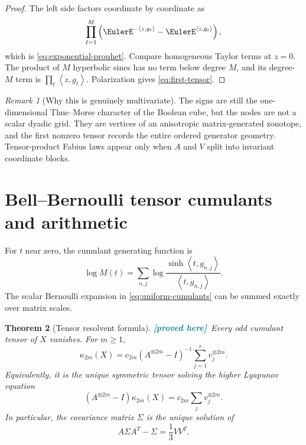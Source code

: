 \documentclass[11pt,oneside]{article}
\newtheorem{theorem}{Theorem}[section]
\theoremstyle{definition}
\theoremstyle{remark}
\newtheorem{remark}[theorem]{Remark}
\newcommand{\ip}[2]{\left\langle #1,#2\right\rangle}
\newcommand{\New}{\textcolor{teal}{\textbf{[proved here]}}}
\begin{document}
\begin{proof}
The left side factors coordinate by coordinate as
\[
 \prod_{\ell=1}^M
 \left(\EulerE^{-\ip{z}{g_\ell}}-\EulerE^{\ip{z}{g_\ell}}\right),
\]
which is \eqref{eq:exponential-prouhet}.  Compare homogeneous Taylor terms at
$z=0$.  The product of $M$ hyperbolic sines has no term below degree $M$, and
its degree-$M$ term is $\prod_\ell\ip{z}{g_\ell}$.  Polarization gives
\eqref{eq:first-tensor}.
\end{proof}

\begin{remark}[Why this is genuinely multivariate]
The signs are still the one-dimensional Thue--Morse character of the Boolean
cube, but the nodes are not a scalar dyadic grid.  They are vertices of an
anisotropic matrix-generated zonotope, and the first nonzero tensor records the
entire ordered generator geometry.  Tensor-product Fabius laws appear only when
$A$ and $V$ split into invariant coordinate blocks.
\end{remark}

\section{Bell--Bernoulli tensor cumulants and arithmetic}
\label{sec:cumulants}

For $t$ near zero, the cumulant generating function is
\begin{equation}
 \log M(t)
 =\sum_{n,j}\log\frac{\sinh\ip{t}{g_{n,j}}}{\ip{t}{g_{n,j}}}.
 \label{eq:cgf}
\end{equation}
The scalar Bernoulli expansion in \eqref{eq:uniform-cumulants} can be summed
exactly over matrix scales.

\begin{theorem}[Tensor resolvent formula]
\label{thm:tensor-resolvent}
\New\ Every odd cumulant tensor of $X$ vanishes.  For $m\ge1$,
\begin{equation}
 \boxed{\quad
 \kappa_{2m}(X)
 =c_{2m}(A^{\otimes 2m}-I)^{-1}
   \sum_{j=1}^r v_j^{\otimes 2m}.
 \quad}
 \label{eq:tensor-resolvent}
\end{equation}
Equivalently, it is the unique symmetric tensor solving the higher Lyapunov
equation
\begin{equation}
 (A^{\otimes 2m}-I)\kappa_{2m}(X)
 =c_{2m}\sum_jv_j^{\otimes 2m}.
 \label{eq:higher-lyapunov}
\end{equation}
In particular, the covariance matrix $\Sigma$ is the unique solution of
\begin{equation}
 A\Sigma A^T-\Sigma=\frac13VV^T.
 \label{eq:lyapunov}
\end{equation}
\end{theorem}
\end{document}
